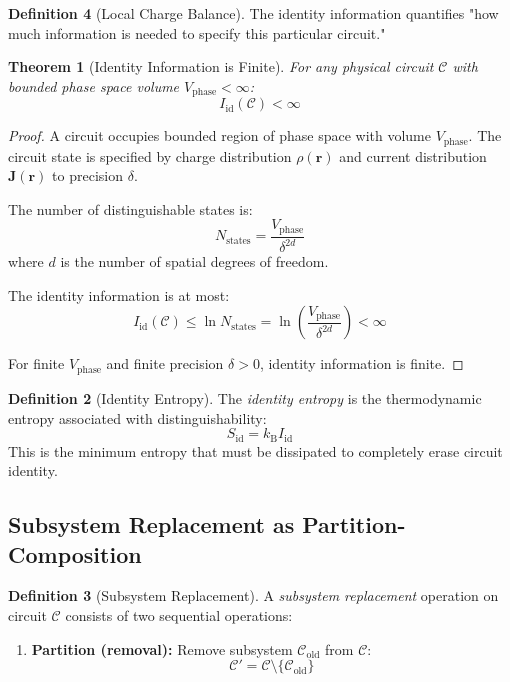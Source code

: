 \documentclass[12pt,a4paper]{article}
\theoremstyle{plain}
\newtheorem{theorem}{Theorem}[section]
\theoremstyle{definition}
\newtheorem{definition}[theorem]{Definition}
\theoremstyle{remark}
\newcommand{\kB}{k_{\mathrm{B}}}
\begin{document}
\begin{definition}[Local Charge Balance]
The identity information quantifies "how much information is needed to specify this particular circuit."

\begin{theorem}[Identity Information is Finite]
\label{thm:identity_finite}
For any physical circuit $\mathcal{C}$ with bounded phase space volume $V_{\text{phase}} < \infty$:
\begin{equation}
I_{\text{id}}(\mathcal{C}) < \infty
\end{equation}
\end{theorem}

\begin{proof}
A circuit occupies bounded region of phase space with volume $V_{\text{phase}}$. The circuit state is specified by charge distribution $\rho(\mathbf{r})$ and current distribution $\mathbf{J}(\mathbf{r})$ to precision $\delta$.

The number of distinguishable states is:
\begin{equation}
N_{\text{states}} = \frac{V_{\text{phase}}}{\delta^{2d}}
\end{equation}
where $d$ is the number of spatial degrees of freedom.

The identity information is at most:
\begin{equation}
I_{\text{id}}(\mathcal{C}) \leq \ln N_{\text{states}} = \ln\left(\frac{V_{\text{phase}}}{\delta^{2d}}\right) < \infty
\end{equation}

For finite $V_{\text{phase}}$ and finite precision $\delta > 0$, identity information is finite.
\end{proof}

\begin{definition}[Identity Entropy]
\label{def:identity_entropy}
The \emph{identity entropy} is the thermodynamic entropy associated with distinguishability:
\begin{equation}
S_{\text{id}} = \kB I_{\text{id}}
\end{equation}
This is the minimum entropy that must be dissipated to completely erase circuit identity.
\end{definition}

\subsection{Subsystem Replacement as Partition-Composition}

\begin{definition}[Subsystem Replacement]
\label{def:replacement}
A \emph{subsystem replacement} operation on circuit $\mathcal{C}$ consists of two sequential operations:
\begin{enumerate}
\item \textbf{Partition (removal):} Remove subsystem $\mathcal{C}_{\text{old}}$ from $\mathcal{C}$:
\begin{equation}
\mathcal{C}' = \mathcal{C} \setminus \{\mathcal{C}_{\text{old}}\}
\end{equation}


\end{enumerate}
\end{definition}
\end{definition}
\end{document}
